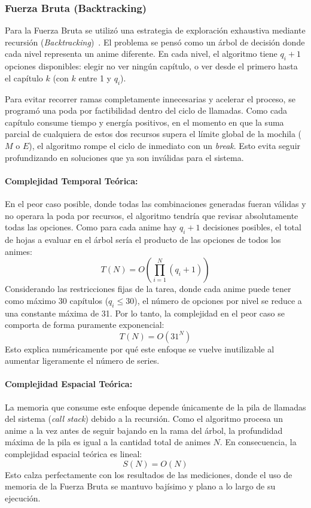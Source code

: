 \subsubsection{Fuerza Bruta (Backtracking)}

Para la Fuerza Bruta se utilizó una estrategia de exploración exhaustiva mediante recursión (\textit{Backtracking})~\cite{geeks_knapsack_backtracking}. El problema se pensó como un árbol de decisión donde cada nivel representa un anime diferente. En cada nivel, el algoritmo tiene $q_i + 1$ opciones disponibles: elegir no ver ningún capítulo, o ver desde el primero hasta el capítulo $k$ (con $k$ entre 1 y $q_i$).

Para evitar recorrer ramas completamente innecesarias y acelerar el proceso, se programó una poda por factibilidad dentro del ciclo de llamadas. Como cada capítulo consume tiempo y energía positivos, en el momento en que la suma parcial de cualquiera de estos dos recursos supera el límite global de la mochila ($M$ o $E$), el algoritmo rompe el ciclo de inmediato con un \textit{break}. Esto evita seguir profundizando en soluciones que ya son inválidas para el sistema.

\paragraph{Complejidad Temporal Teórica:} 
En el peor caso posible, donde todas las combinaciones generadas fueran válidas y no operara la poda por recursos, el algoritmo tendría que revisar absolutamente todas las opciones. Como para cada anime hay $q_i + 1$ decisiones posibles, el total de hojas a evaluar en el árbol sería el producto de las opciones de todos los animes:
\begin{equation}
T(N) = O\left(\prod_{i=1}^{N} (q_i + 1)\right)
\end{equation}
Considerando las restricciones fijas de la tarea, donde cada anime puede tener como máximo 30 capítulos ($q_i \le 30$), el número de opciones por nivel se reduce a una constante máxima de 31. Por lo tanto, la complejidad en el peor caso se comporta de forma puramente exponencial:
\begin{equation}
T(N) = O(31^N)
\end{equation}
Esto explica numéricamente por qué este enfoque se vuelve inutilizable al aumentar ligeramente el número de series.

\paragraph{Complejidad Espacial Teórica:}
La memoria que consume este enfoque depende únicamente de la pila de llamadas del sistema (\textit{call stack}) debido a la recursión. Como el algoritmo procesa un anime a la vez antes de seguir bajando en la rama del árbol, la profundidad máxima de la pila es igual a la cantidad total de animes $N$. En consecuencia, la complejidad espacial teórica es lineal:
\begin{equation}
S(N) = O(N)
\end{equation}
Esto calza perfectamente con los resultados de las mediciones, donde el uso de memoria de la Fuerza Bruta se mantuvo bajísimo y plano a lo largo de su ejecución.
